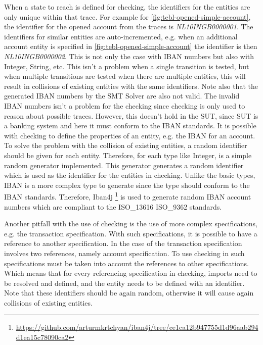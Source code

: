 When a state to reach is defined for checking, the identifiers for the entities are only unique within that trace. For example for \autoref{fig:tebl-opened-simple-account}, the identifier for the opened account from the traces is \textit{NL10INGB0000001}. The identifiers for similar entities are auto-incremented, e.g. when an additional account entity is specified in \autoref{fig:tebl-opened-simple-account} the identifier is then \textit{NL10INGB0000002}. This is not only the case with IBAN numbers but also with Integer, String, etc. This isn't a problem when a single transition is tested, but when multiple transitions are tested when there are multiple entities, this will result in collisions of existing entities with the same identifiers. Note also that the generated IBAN numbers by the SMT Solver are also not valid.  The invalid IBAN numbers isn't a problem for the checking since checking is only used to reason about possible traces. However, this doesn't hold in the SUT, since SUT is a banking system and here it must conform to the IBAN standards. It is possible with checking to define the properties of an entity, e.g. the IBAN for an account. To solve the problem with the collision of existing entities, a random identifier should be given for each entity. Therefore, for each type like Integer, is a simple random generator implemented. This generator generates a random identifier which is used as the identifier for the entities in checking. Unlike the basic types, IBAN is a more complex type to generate since the type should conform to the IBAN standards. Therefore, Iban4j \footnote{\url{https://github.com/arturmkrtchyan/iban4j/tree/ce1ca12b947755d1d96aab294d1ea15c78090ca2}} is used to generate random IBAN account numbers which are compliant to the ISO\_13616 ISO\_9362 standards. 

Another pitfall with the use of checking is the use of more complex specifications, e.g. the transaction specification. With such specifications, it is possible to have a reference to another specification. In the case of the transaction specification involves two references, namely account specification. To use checking in such specifications must be taken into account the references to other specifications. Which means that for every referencing specification in checking, imports need to be resolved and defined, and the entity needs to be defined with an identifier. Note that these identifiers should be again random, otherwise it will cause again collisions of existing entities. 

